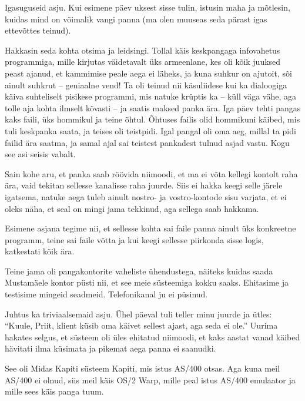 
Igasuguseid asju. Kui esimene päev uksest sisse tulin, istusin maha ja mõtlesin, kuidas mind on võimalik 
vangi panna (ma olen muuseas seda 
pärast igas ettevõttes teinud). 

Hakkasin seda kohta otsima ja leidsingi. Tollal käis keskpangaga 
infovahetus programmiga, mille kirjutas väidetavalt üks
armeenlane, kes oli kõik juuksed peast ajanud, et kammimise peale aega ei 
läheks, ja kuna suhkur on ajutoit, sõi ainult suhkrut -- geniaalne vend! Ta oli 
teinud nii käsuliidese kui ka dialoogiga käiva suhteliselt pisikese programmi, mis natuke 
krüptis ka -- küll väga vähe, aga tolle aja kohta ilmselt kõvasti -- ja saatis maksed 
panka ära. Iga päev tehti pangas kaks faili, üks hommikul ja teine õhtul. 
Õhtuses failis olid hommikuni käibed, mis tuli keskpanka saata, ja teises oli 
teistpidi. Igal pangal oli oma aeg, millal ta pidi failid ära saatma, ja samal 
ajal sai teistest pankadest tulnud asjad vastu. Kogu see asi seisis vabalt. 

Sain kohe aru, et panka saab röövida niimoodi, et ma ei võta kellegi kontolt 
raha ära, vaid tekitan sellesse kanalisse raha juurde. Siis ei hakka keegi 
selle järele igatsema, natuke aega tuleb ainult nostro- ja vostro-kontode sisu 
varjata, et ei oleks näha, et seal on mingi jama tekkinud, aga sellega 
saab hakkama. 

Esimene asjana tegime nii, et sellesse kohta sai faile panna 
ainult üks konkreetne programm, teine sai faile võtta ja kui keegi sellesse 
piirkonda sisse logis, katkestati kõik ära. 

Teine jama oli 
pangakontorite vaheliste ühendustega, näiteks kuidas saada 
Mustamäele kontor püsti nii, et see meie süsteemiga kokku saaks. Ehitasime ja 
testisime mingeid seadmeid. Telefonikanal ju ei 
püsinud.

Juhtus ka triviaalsemaid asju. Ühel päeval tuli teller minu juurde ja ütles: 
\enquote{Kuule, Priit, klient küsib oma käivet sellest ajast, aga seda ei ole.} 
Uurima hakates selgus, et süsteem oli üles ehitatud niimoodi, et kaks aastat vanad 
käibed hävitati ilma küsimata ja pikemat aega panna ei saanudki. 


See oli Midas Kapiti süsteem Kapiti, mis istus AS/400 otsas. 
Aga kuna meil AS/400 ei olnud, siis meil käis OS/2 Warp, mille peal istus AS/400 emulaator ja mille sees käis panga tuum. 

